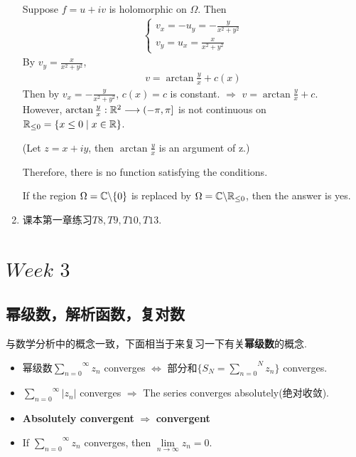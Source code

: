 \begin{enumerate}
		\vspace{2em}
		\begin{solution}
			Suppose $f = u + i v$ is holomorphic on $\Omega$. Then
			\begin{align}
				\begin{cases}
					v_x = -u_y = -\frac{y}{x^2 + y^2} \\
					v_y = u_x = \frac{x}{x^2 + y^2}
				\end{cases}
			\end{align}
			By $v_y = \frac{x}{x^2 + y^2}$,
			\begin{align}
				v = \arctan{\frac{y}{x}} + c(x)
			\end{align}
			Then by $v_x = -\frac{y}{x^2 + y^2}$, $c(x) = c$ is constant. $\Rightarrow$ $v = \arctan{\frac{y}{x}} + c$.\\
			However, $\arctan{\frac{y}{x}} : \mathbb{R}^2 \longrightarrow (-\pi , \pi]$ is not continuous on $\mathbb{R}_{\leq 0} = \{ x \leq 0 \mid x \in \mathbb{R} \}$.
			\begin{center}
				(Let $z = x + iy$, then $\arctan{\frac{y}{x}}$ is an argument of z.)
			\end{center}
			Therefore, there is no function satisfying the conditions.
			\begin{rmk}
				If the region $\Omega = \mathbb{C} \backslash \{ 0 \}$ is replaced by $\Omega = \mathbb{C} \backslash \mathbb{R}_{\leq 0}$, then the answer is yes.
			\end{rmk}
		\end{solution}
		
		\vspace{2em}
		
		\item 课本第一章练习$T8 , T9 , T10 , T13$.
	\end{enumerate}

\chapter{$Week \,\, 3$}
\section{幂级数，解析函数，复对数}
	与数学分析中的概念一致，下面相当于来复习一下有关\textbf{幂级数}的概念.
	\begin{itemize}
		\item 幂级数$\overset{\infty}{\underset{n = 0}{\sum}}{z_n}$ converges $\Leftrightarrow$ 部分和$\{ S_N = \overset{N}{\underset{n = 0}{\sum}}{z_n} \}$ converges.
		
		\item $\overset{\infty}{\underset{n = 0}{\sum}}{\left| z_n \right|}$ converges $\Rightarrow$ The series converges absolutely(绝对收敛).
		
		\item \textbf{Absolutely convergent} $\Rightarrow$ \textbf{convergent}
		
		\item If $\overset{\infty}{\underset{n = 0}{\sum}}{z_n}$ converges, then $\underset{n \to \infty}{\lim}{z_n} = 0$.
	\end{itemize}

